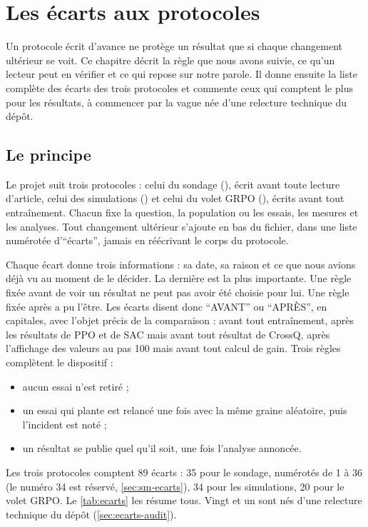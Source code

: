 \chapter{Les écarts aux protocoles}
\label{chap:09-ecarts}

Un protocole écrit d'avance ne protège un résultat que si chaque changement ultérieur se voit. Ce
chapitre décrit la règle que nous avons suivie, ce qu'un lecteur peut en vérifier et ce qui repose
sur notre parole. Il donne ensuite la liste complète des écarts des trois protocoles et commente
ceux qui comptent le plus pour les résultats, à commencer par la vague née d'une
relecture technique du dépôt.

\section{Le principe}
\label{sec:ecarts-principe}

Le projet suit trois protocoles : celui du sondage (), écrit
avant toute lecture d'article, celui des simulations () et celui du volet
GRPO (), écrits avant tout entraînement. Chacun fixe la question, la
population ou les essais, les mesures et les analyses. Tout changement ultérieur s'ajoute en bas du
fichier, dans une liste numérotée d'\enquote{écarts}, jamais en réécrivant le corps du protocole.

Chaque écart donne trois informations : sa date, sa raison et ce que nous avions déjà vu au moment
de le décider. La dernière est la plus importante. Une règle fixée avant de voir un résultat ne peut
pas avoir été choisie pour lui. Une règle fixée après a pu l'être. Les écarts disent donc
\enquote{AVANT} ou \enquote{APRÈS}, en capitales, avec l'objet précis de la comparaison : avant tout
entraînement, après les résultats de PPO et de SAC mais avant tout résultat de CrossQ, après
l'affichage des valeurs au pas 100 mais avant tout calcul de gain. Trois règles complètent le
dispositif :
\begin{itemize}
  \item aucun essai n'est retiré ;
  \item un essai qui plante est relancé une fois avec la même graine aléatoire, puis l'incident est
        noté ;
  \item un résultat se publie quel qu'il soit, une fois l'analyse annoncée.
\end{itemize}

Les trois protocoles comptent 89 écarts : 35 pour le sondage, numérotés de 1 à 36 (le numéro 34 est
réservé, \cref{sec:sm-ecarts}), 34 pour les simulations, 20 pour le volet GRPO. Le \cref{tab:ecarts} les résume tous. Vingt et un sont nés d'une relecture technique
du dépôt (\cref{sec:ecarts-audit}).

